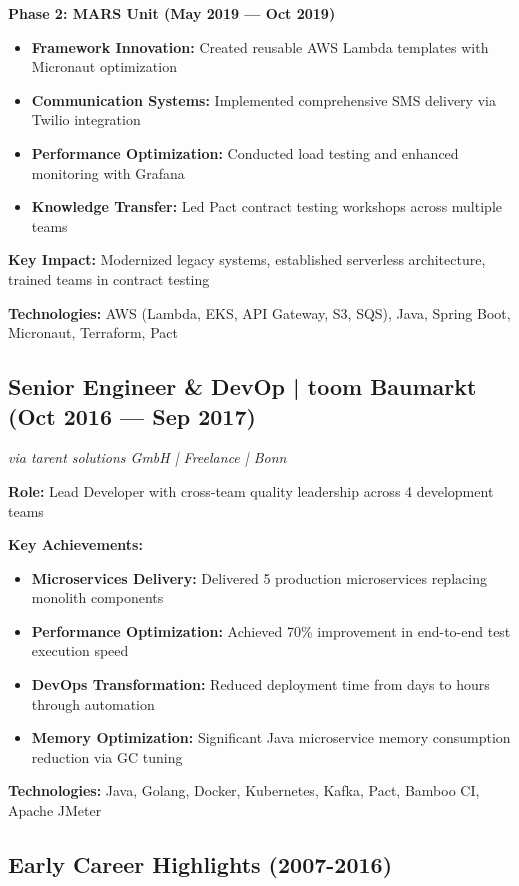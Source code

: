 \documentclass[10pt,a4paper]{article}
\begin{document}
\textbf{Phase 2: MARS Unit (May 2019 — Oct 2019)}
\begin{itemize}[leftmargin=*,noitemsep,topsep=0pt]
\item \textbf{Framework Innovation:} Created reusable AWS Lambda templates with Micronaut optimization
\item \textbf{Communication Systems:} Implemented comprehensive SMS delivery via Twilio integration
\item \textbf{Performance Optimization:} Conducted load testing and enhanced monitoring with Grafana
\item \textbf{Knowledge Transfer:} Led Pact contract testing workshops across multiple teams
\end{itemize}

\textbf{Key Impact:} Modernized legacy systems, established serverless architecture, trained teams in contract testing

\textbf{Technologies:} AWS (Lambda, EKS, API Gateway, S3, SQS), Java, Spring Boot, Micronaut, Terraform, Pact

\subsection{Senior Engineer \& DevOp | toom Baumarkt (Oct 2016 — Sep 2017)}
\textit{via tarent solutions GmbH | Freelance | Bonn}

\textbf{Role:} Lead Developer with cross-team quality leadership across 4 development teams

\textbf{Key Achievements:}
\begin{itemize}[leftmargin=*,noitemsep,topsep=0pt]
\item \textbf{Microservices Delivery:} Delivered 5 production microservices replacing monolith components
\item \textbf{Performance Optimization:} Achieved 70\% improvement in end-to-end test execution speed
\item \textbf{DevOps Transformation:} Reduced deployment time from days to hours through automation
\item \textbf{Memory Optimization:} Significant Java microservice memory consumption reduction via GC tuning
\end{itemize}

\textbf{Technologies:} Java, Golang, Docker, Kubernetes, Kafka, Pact, Bamboo CI, Apache JMeter

\subsection{Early Career Highlights (2007-2016)}
\end{document}
